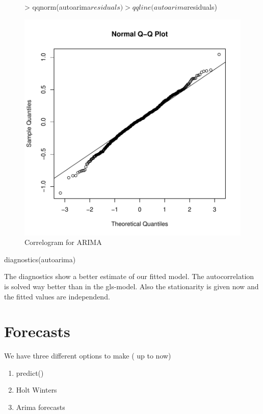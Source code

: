 \documentclass[11pt, a4paper]{article} %
\begin{document}
\begin{figure}[H]
\centering
\begin{Schunk}
\begin{Sinput}
> qqnorm(autoarima$residuals)
> qqline(autoarima$residuals)
\end{Sinput}
\end{Schunk}
\includegraphics{alleselena-qqarima}
\caption{Correlogram for ARIMA}
\label{qqarima}
\end{figure}

diagnostics(autoarima)

The diagnostics show a better estimate of our fitted model. 
The autocorrelation is solved way better than in the gls-model. Also the stationarity is given now and the fitted values are independend. 



\section{Forecasts}%
We have three different options to make ( up to now)
\begin{enumerate}
\item predict()
\item Holt Winters
\item Arima forecasts
\end{enumerate}
\end{document}

